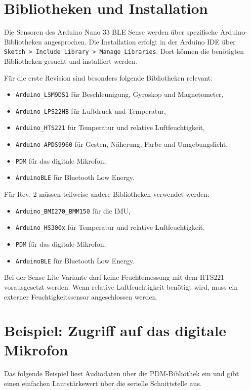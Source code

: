 \section{Bibliotheken und Installation}

Die Sensoren des Arduino Nano 33 BLE Sense werden über spezifische Arduino-Bibliotheken angesprochen. Die Installation erfolgt in der Arduino IDE über \texttt{Sketch > Include Library > Manage Libraries}. Dort können die benötigten Bibliotheken gesucht und installiert werden.

Für die erste Revision sind besonders folgende Bibliotheken relevant:
\begin{itemize}
	\item \texttt{Arduino\_LSM9DS1} für Beschleunigung, Gyroskop und Magnetometer,
	\item \texttt{Arduino\_LPS22HB} für Luftdruck und Temperatur,
	\item \texttt{Arduino\_HTS221} für Temperatur und relative Luftfeuchtigkeit,
	\item \texttt{Arduino\_APDS9960} für Gesten, Näherung, Farbe und Umgebungslicht,
	\item \texttt{PDM} für das digitale Mikrofon,
	\item \texttt{ArduinoBLE} für Bluetooth Low Energy.
\end{itemize}

Für Rev. 2 müssen teilweise andere Bibliotheken verwendet werden:
\begin{itemize}
	\item \texttt{Arduino\_BMI270\_BMM150} für die IMU,
	\item \texttt{Arduino\_HS300x} für Temperatur und relative Luftfeuchtigkeit,
	\item \texttt{PDM} für das digitale Mikrofon,
	\item \texttt{ArduinoBLE} für Bluetooth Low Energy.
\end{itemize}

Bei der Sense-Lite-Variante darf keine Feuchtemessung mit dem HTS221 vorausgesetzt werden. Wenn relative Luftfeuchtigkeit benötigt wird, muss ein externer Feuchtigkeitssensor angeschlossen werden.

\section{Beispiel: Zugriff auf das digitale Mikrofon}

Das folgende Beispiel liest Audiodaten über die PDM-Bibliothek ein und gibt einen einfachen Lautstärkewert über die serielle Schnittstelle aus.

